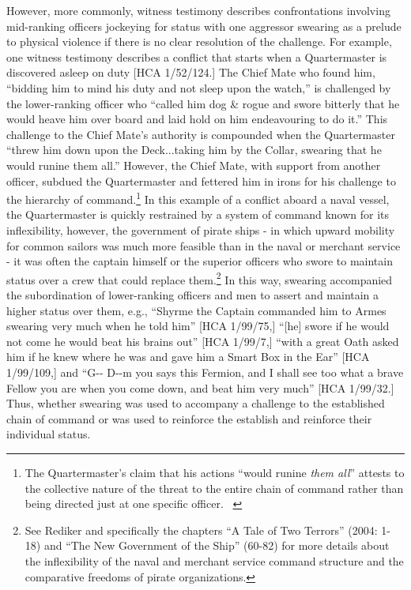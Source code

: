 \begin{styleStandard}
However, more commonly, witness testimony describes confrontations involving mid-ranking officers jockeying for status with one aggressor swearing as a prelude to physical violence if there is no clear resolution of the challenge. For example, one witness testimony describes a conflict that starts when a Quartermaster is discovered asleep on duty [HCA 1/52/124.] The Chief Mate who found him, “bidding him to mind his duty and not sleep upon the watch,” is challenged by the lower-ranking officer who “called him dog \& rogue and swore bitterly that he would heave him over board and laid hold on him endeavouring to do it.” This challenge to the Chief Mate’s authority is compounded when the Quartermaster “threw him down upon the Deck...taking him by the Collar, swearing that he would runine them all.” However, the Chief Mate, with support from another officer, subdued the Quartermaster and fettered him in irons for his challenge to the hierarchy of command.\footnote{ The Quartermaster’s claim that his actions “would runine \textit{them all}” attests to the collective nature of the threat to the entire chain of command rather than being directed just at one specific officer. \ } In this example of a conflict aboard a naval vessel, the Quartermaster is quickly restrained by a system of command known for its inflexibility, however, the government of pirate ships - in which upward mobility for common sailors was much more feasible than in the naval or merchant service - it was often the captain himself or the superior officers who swore to maintain status over a crew that could replace them.\footnote{ See Rediker and specifically the chapters “A Tale of Two Terrors” (2004: 1-18) and “The New Government of the Ship” (60-82) for more details about the inflexibility of the naval and merchant service command structure and the comparative freedoms of pirate organizations. \par } In this way, swearing accompanied the subordination of lower-ranking officers and men to assert and maintain a higher status over them, e.g., “Shyrme the Captain commanded him to Armes swearing very much when he told him” [HCA 1/99/75,] “[he] swore if he would not come he would beat his brains out” [HCA 1/99/7,] “with a great Oath asked him if he knew where he was and gave him a Smart Box in the Ear” [HCA 1/99/109,] and “G-{}- D-{}-m you says this Fermion, and I shall see too what a brave Fellow you are when you come down, and beat him very much” [HCA 1/99/32.] Thus, whether swearing was used to accompany a challenge to the established chain of command or was used to reinforce the  establish and reinforce their individual status.
\end{styleStandard}

